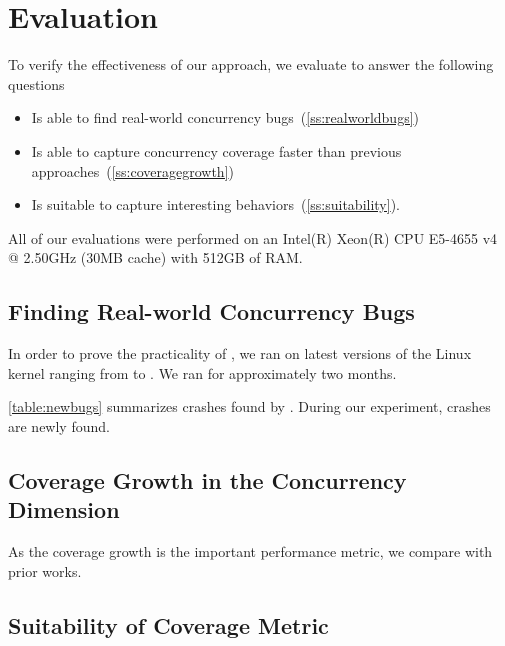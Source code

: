 \section{Evaluation}
\label{s:eval}

To verify the effectiveness of our approach, we evaluate \sys to
answer the following questions
\begin{itemize}
\item Is \sys able to find real-world concurrency
  bugs~(\autoref{ss:realworldbugs})
\item Is \sys able to capture concurrency coverage faster than
  previous approaches~(\autoref{ss:coveragegrowth})
\item Is \XXX{} suitable to capture interesting
  behaviors~(\autoref{ss:suitability}).
\end{itemize}

%
All of our evaluations were performed on an Intel(R) Xeon(R) CPU
E5-4655 v4 @ 2.50GHz (30MB cache) with 512GB of RAM.


\subsection{Finding Real-world Concurrency Bugs}
\label{ss:realworldbugs}

\begin{table}[t]
  
  \centering
  \caption{}
  \label{table:newbugs}
\end{table}

In order to prove the practicality of \sys, we ran \sys on latest
versions of the Linux kernel ranging from \XXX{} to \XXX{}.  We ran
\sys for approximately two months.

\autoref{table:newbugs} summarizes crashes found by \sys. During our
experiment, \totalbugs crashes are newly found.
%




\subsection{Coverage Growth in the Concurrency Dimension}
\label{ss:coveragegrowth}

\begin{table}[t]
  
  \centering
  \caption{}
  \label{table:knownbugs}
\end{table}


As the coverage growth is the important performance metric, we compare
\sys with prior works.




\subsection{Suitability of Coverage Metric}
\label{ss:suitability}



